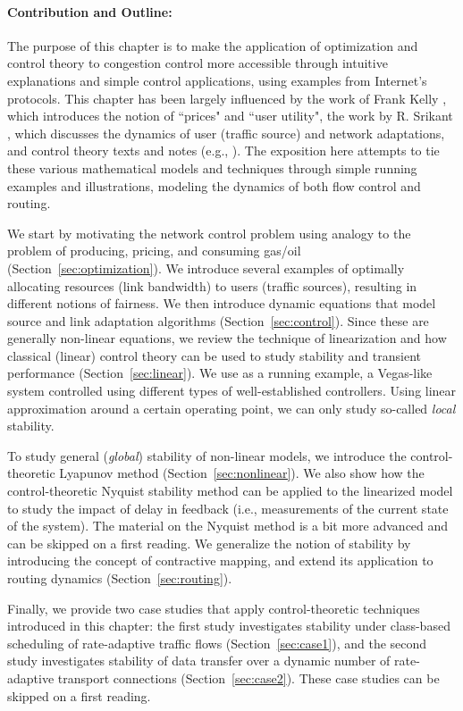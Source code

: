 \documentclass{article}
\begin{document}
\paragraph{Contribution and Outline:}
The purpose of this chapter is to make the application of optimization and control theory to congestion control
more accessible through intuitive explanations and simple control applications, 
using examples from Internet's protocols.
This chapter has been largely influenced by the work of Frank Kelly \cite{Kelly-2001}, 
which introduces the notion of ``prices" and ``user utility",
the work by R. Srikant \cite{Srikant:2004},
which discusses the dynamics of user (traffic source) and network adaptations,
and control theory texts and notes (e.g., \cite{Ogata:2010,Lu:2001}). 
The exposition here attempts to tie these various mathematical models and techniques
through simple running examples and illustrations, 
modeling the dynamics of both flow control and routing.
 
We start by motivating the network control problem using analogy to 
the problem of producing, pricing, and consuming gas/oil (Section~\ref{sec:optimization}).
We introduce several examples of optimally allocating resources (link bandwidth) to users (traffic sources),
resulting in different notions of fairness. 
We then introduce dynamic equations that model source and link adaptation algorithms (Section~\ref{sec:control}).
Since these are generally non-linear equations,
we review the technique of linearization and how classical (linear) control theory can be used
to study stability and transient performance (Section~\ref{sec:linear}).
We use as a running example, a Vegas-like system controlled using different types of well-established controllers. 
Using linear approximation around a certain operating point, 
we can only study so-called {\em local} stability.

To study general ({\em global}) stability of non-linear models, 
we introduce the control-theoretic Lyapunov method (Section~\ref{sec:nonlinear}).
We also show how the control-theoretic Nyquist stability method can be applied
to the linearized model to study the impact of delay in feedback (i.e., measurements of the current state of the system).
The material on the Nyquist method is a bit more advanced and can be skipped on a first reading.
We generalize the notion of stability by introducing the concept of contractive mapping,
and extend its application to routing dynamics (Section~\ref{sec:routing}).

Finally, 
we provide two case studies that apply control-theoretic techniques introduced in this chapter:
the first study investigates stability under class-based scheduling
of rate-adaptive traffic flows (Section~\ref{sec:case1}),
and the second study investigates stability of data transfer over 
a dynamic number of rate-adaptive transport connections (Section~\ref{sec:case2}).
These case studies can be skipped on a first reading.
\end{document}

